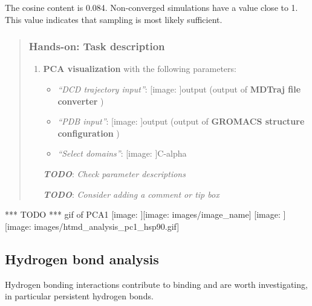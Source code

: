 \documentclass[twocolumn]{bmcart}%
\def\texttt{[image: ]}
\providecommand{\tightlist}{%
  \setlength{\itemsep}{0pt}\setlength{\parskip}{0pt}}
\begin{document}
The cosine content is 0.084. Non-converged simulations have a value
close to 1. This value indicates that sampling is most likely
sufficient.

\begin{quote}
\hypertarget{hands-on-task-description-15}{%
\subsubsection{Hands-on: Task
description}\label{hands-on-task-description-15}}

\begin{enumerate}
\def\labelenumi{\arabic{enumi}.}
\tightlist
\item
  \textbf{PCA visualization} with the following parameters:

  \begin{itemize}
  \tightlist
  \item
    \emph{``DCD trajectory input''}: \texttt{output} (output of
    \textbf{MDTraj file converter} )
  \item
    \emph{``PDB input''}: \texttt{output} (output of \textbf{GROMACS
    structure configuration} )
  \item
    \emph{``Select domains''}: \texttt{C-alpha}
  \end{itemize}

  \textbf{\emph{TODO}}: \emph{Check parameter descriptions}

  \textbf{\emph{TODO}}: \emph{Consider adding a comment or tip box}
\end{enumerate}


\end{quote}

*** TODO *** gif of PCA1 \texttt{[image: images/image\_name]}
\texttt{[image: images/htmd\_analysis\_pc1\_hsp90.gif]}

\hypertarget{hydrogen-bond-analysis}{%
\subsection{Hydrogen bond analysis}\label{hydrogen-bond-analysis}}

Hydrogen bonding interactions contribute to binding and are worth
investigating, in particular persistent hydrogen bonds.
\end{document}
